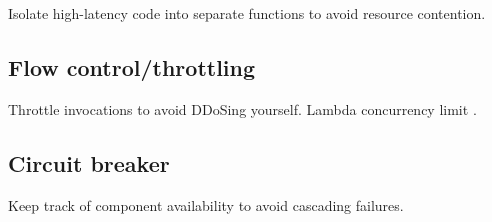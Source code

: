 Isolate high-latency code into separate functions to avoid resource contention.

\subsection{Flow control/throttling} \label{subsec:Flow control/throttling}

Throttle invocations to avoid DDoSing yourself. Lambda concurrency limit \textcite{aws18serverlessLens}.

\subsection{Circuit breaker} \label{subsec:Circuit breaker}

Keep track of component availability to avoid cascading failures.

